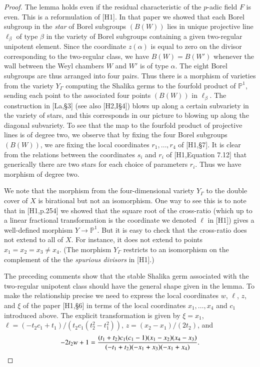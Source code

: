 \documentclass{amsart}
\newcommand\bP{{\mathbb P}}
\begin{document}
\bigskip
\noindent
\begin{proof}    The lemma holds even if the residual characteristic
of the $p$-adic field $F$ is even.
This is a reformulation of [H1].  In that paper we showed
that each Borel subgroup in 
the {\it star} of Borel subgroups $(B(W))$ lies in unique 
projective line
$\ell_\beta$ of type $\beta$ in the variety of Borel subgroups containing
a given two-regular unipotent element.  Since the coordinate $z(\alpha)$ is
equal to zero on the divisor corresponding to the two-regular class,
we have $B(W) = B(W')$ whenever the wall between the Weyl chambers
$W$ and $W'$ is of type $\alpha$.  
The eight Borel subgroups are thus arranged into four pairs.
Thus there is a morphism of varieties
from the variety $Y_\Gamma$ computing the Shalika germs to the fourfold
product of $\bP^1$, sending each point to the associated four points
$(B(W))$ in $\ell_\beta$.   The construction in [La,\S3] (see also [H2,I\S4])
blows up along a certain subvariety in the variety of stars, and
this corresponds in our picture to blowing up along the diagonal subvariety.
To see that the map to the fourfold product of projective lines is
of degree two, we observe that by fixing the four Borel subgroups
$(B(W))$, we are fixing the local coordinates
$r_1,\ldots,r_4$ of [H1,\S7].  It is clear from the relations between the
coordinates $s_i$ and $r_i$ of [H1,Equation 7.12] that generically there are two
stars for each choice of parameters $r_i$.  Thus we have morphism
of degree two.

We note that the morphism from the four-dimensional variety $Y_\Gamma$ to
the double cover of $X$ is birational but not an isomorphism.  One
way to see this is to note that in [H1,p.254] we showed that the 
square root of the cross-ratio
(which up to a linear fractional transformation is the coordinate
we denoted $\ell$ in [H1]) gives a well-defined morphism $Y\to\bP^1$.
But it is easy to check that the cross-ratio does not extend to all of
$X$.  For instance, it does not extend to points $x_1=x_2=x_3\ne x_4$.
(The morphism $Y_\Gamma$ restricts to an isomorphism
on the complement of the
the {\it spurious divisors} in [H1].)

The preceding comments show
that the stable Shalika germ associated with the two-regular
unipotent class should have the general shape given in the lemma.
To make the relationship precise we need to express the local
coordinates $w$, $\ell$, $z$, and $\xi$ of the paper [H1,\S6] in terms
of the local coordinates $x_1,\ldots,x_4$ and $c_1$ introduced above.
The explicit transformation is given by $\xi=x_1$, $\ell =
(-t_2 c_1 + t_1)/(t_2 c_1 (t_2^2-t_1^2))$, $z= (x_2-x_1)/(2 t_2)$,
and 
$$-2 t_2 w + 1 = {(t_1+t_2) c_1 (c_1-1) (x_1-x_2) (x_4-x_3)  
                \over (-t_1+t_2)(-x_1+x_3)(-x_1+x_4)}.$$


\end{proof}
\end{document}
